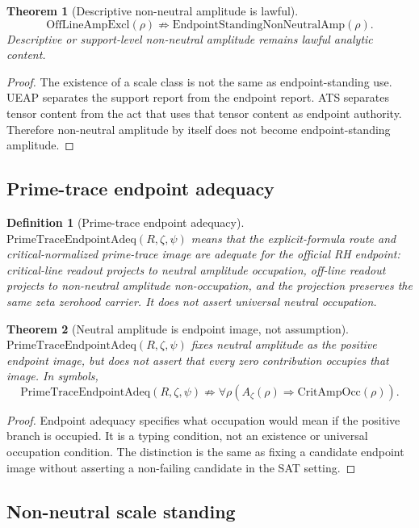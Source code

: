 \documentclass[11pt]{article}
\newtheorem{definition}{Definition}[section]
\newtheorem{theorem}{Theorem}[section]
\newcommand{\Az}{A_{\zeta}}
\newcommand{\CritAmpOcc}{\mathrm{CritAmpOcc}}
\newcommand{\OffAmpExcl}{\mathrm{OffLineAmpExcl}}
\newcommand{\AmpStand}{\mathrm{EndpointStandingNonNeutralAmp}}
\newcommand{\PrimeTraceAdeq}{\mathrm{PrimeTraceEndpointAdeq}}
\begin{document}
\begin{theorem}[Descriptive non-neutral amplitude is lawful]
\[
\OffAmpExcl(\rho)\not\Rightarrow \AmpStand(\rho).
\]
Descriptive or support-level non-neutral amplitude remains lawful analytic content.
\end{theorem}

\begin{proof}
The existence of a scale class is not the same as endpoint-standing use.  UEAP separates the support report from the endpoint report.  ATS separates tensor content from the act that uses that tensor content as endpoint authority.  Therefore non-neutral amplitude by itself does not become endpoint-standing amplitude.
\end{proof}

\subsection{Prime-trace endpoint adequacy}

\begin{definition}[Prime-trace endpoint adequacy]
\(\PrimeTraceAdeq(R,\zeta,\psi)\) means that the explicit-formula route and critical-normalized prime-trace image are adequate for the official RH endpoint: critical-line readout projects to neutral amplitude occupation, off-line readout projects to non-neutral amplitude non-occupation, and the projection preserves the same zeta zerohood carrier.  It does not assert universal neutral occupation.
\end{definition}

\begin{theorem}[Neutral amplitude is endpoint image, not assumption]
\(\PrimeTraceAdeq(R,\zeta,\psi)\) fixes neutral amplitude as the positive endpoint image, but does not assert that every zero contribution occupies that image.  In symbols,
\[
\PrimeTraceAdeq(R,\zeta,\psi)\not\Rightarrow \forall \rho(\Az(\rho)\Rightarrow \CritAmpOcc(\rho)).
\]
\end{theorem}

\begin{proof}
Endpoint adequacy specifies what occupation would mean if the positive branch is occupied.  It is a typing condition, not an existence or universal occupation condition.  The distinction is the same as fixing a candidate endpoint image without asserting a non-failing candidate in the SAT setting.
\end{proof}

\subsection{Non-neutral scale standing}
\end{document}
